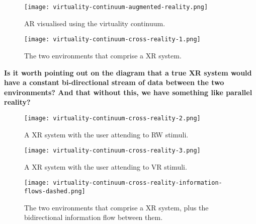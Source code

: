 \begin{figure}[h]
	\begin{center}
		\texttt{[image: virtuality-continuum-augmented-reality.png]}
		\caption{AR visualised using the virtuality continuum.}
		\label{virtuality-continuum-augmented-reality}
	\end{center}
\end{figure}

\begin{figure}[h]
	\begin{center}
		\texttt{[image: virtuality-continuum-cross-reality-1.png]}
		\caption{The two environments that comprise a XR system.}
		\label{virtuality-continuum-cross-reality-1}
	\end{center}
\end{figure}

\textbf{Is it worth pointing out on the diagram that a true XR system would have a constant bi-directional stream of data between the two environments? And that without this, we have something like parallel reality?}

\begin{figure}[h]
	\begin{center}
		\texttt{[image: virtuality-continuum-cross-reality-2.png]}
		\caption{A XR system with the user attending to RW stimuli.}
		\label{virtuality-continuum-cross-reality-2}
	\end{center}
\end{figure}

\begin{figure}[h]
	\begin{center}
		\texttt{[image: virtuality-continuum-cross-reality-3.png]}
		\caption{A XR system with the user attending to VR stimuli.}
		\label{virtuality-continuum-cross-reality-3}
	\end{center}
\end{figure}

\begin{figure}[h]
	\begin{center}
		\texttt{[image: virtuality-continuum-cross-reality-information-flows-dashed.png]}
		\caption{The two environments that comprise a XR system, plus the bidirectional information flow between them.}
	\end{center}
\end{figure}


